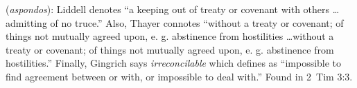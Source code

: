 \item[Irreconcilable,]

(\textit{aspondos}):
Liddell denotes ``a keeping out of treaty or covenant with others \ldots admitting of no truce.'' Also, Thayer connotes ``without a treaty or covenant; of things not mutually agreed upon, e. g. abstinence from hostilities \ldots without a treaty or covenant; of things not mutually agreed upon, e. g. abstinence from hostilities.'' Finally, Gingrich says \emph{irreconcilable} which defines as ``impossible to find agreement between or with, or impossible to deal with.''
Found in 2~Tim 3:3.
